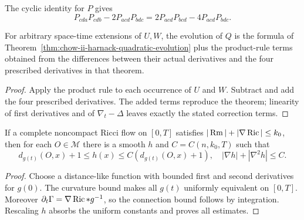 \begin{remark}
\label{rem:chow-ii-m-evolution-equivalent-p-terms}

The cyclic identity for \(P\) gives
\[
P_{cda}P_{cdb}-2P_{acd}P_{bdc}
=2P_{acd}P_{bcd}-4P_{acd}P_{bdc}.
\]
\end{remark}

\begin{example}
\label{ex:chow-ii-unconstrained-harnack-quadratic-evolution}


For arbitrary space-time extensions of \(U,W\), the evolution of \(Q\) is the
formula of Theorem~\ref{thm:chow-ii-harnack-quadratic-evolution} plus the
product-rule terms obtained from the differences between their actual
derivatives and the four prescribed derivatives in that theorem.
\end{example}
\begin{proof}
\sketch Apply the product rule to each occurrence of \(U\) and \(W\).  Subtract and
add the four prescribed derivatives.  The added terms reproduce the theorem;
linearity of first derivatives and of \(\nabla_t-\Delta\) leaves exactly the
stated correction terms.
\end{proof}

\begin{lemma}
\label{lem:chow-ii-harnack-exhaustion-function}

If a complete noncompact Ricci flow on \([0,T]\) satisfies
\(|\operatorname{Rm}|+|\nabla\operatorname{Ric}|\le k_0\), then for each \(O\in\mathcal M\) there is a
smooth \(h\) and \(C=C(n,k_0,T)\) such that
\[
d_{g(t)}(O,x)+1\le h(x)\le C(d_{g(t)}(O,x)+1),
\quad |\nabla h|+|\nabla^2h|\le C.
\]
\end{lemma}
\begin{proof}
\sketch Choose a distance-like function with bounded first and second derivatives for
\(g(0)\).  The curvature bound makes all \(g(t)\) uniformly equivalent on
\([0,T]\).  Moreover \(\partial_t\Gamma=\nabla\operatorname{Ric}* g^{-1}\), so the
connection bound follows by integration.  Rescaling \(h\) absorbs the uniform
constants and proves all estimates.
\end{proof}

